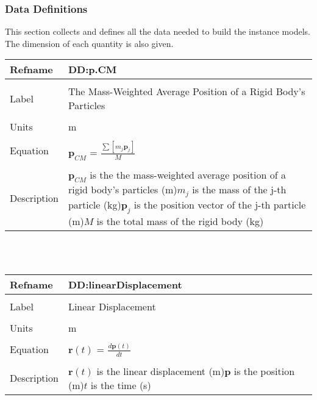 \documentclass[12pt]{article}
\begin{document}
\subsubsection{Data Definitions}
\label{Sec:DataDefi}
This section collects and defines all the data needed to build the instance models. The dimension of each quantity is also given.
~\newline
\noindent \begin{minipage}{\textwidth}
\begin{tabular}{p{} p{}}
\toprule \textbf{Refname} & \textbf{DD:p.CM}
\label{DD:p.CM}
\\ \midrule \\
Label & The Mass-Weighted Average Position of a Rigid Body's Particles
\\ \midrule \\
Units & m
\\ \midrule \\
Equation & ${\mathbf{p}_{CM}}$ = $\frac{\displaystyle\sum{\left[{m_{j}} {\mathbf{p}_{j}}\right]}}{M}$
\\ \midrule \\
Description & ${\mathbf{p}_{CM}}$ is the the mass-weighted average position of a rigid body's particles (m)\newline${m_{j}}$ is the mass of the j-th particle (kg)\newline${\mathbf{p}_{j}}$ is the position vector of the j-th particle (m)\newline$M$ is the total mass of the rigid body (kg)
\\ \bottomrule \end{tabular}
\end{minipage}\\
~\newline
\noindent \begin{minipage}{\textwidth}
\begin{tabular}{p{} p{}}
\toprule \textbf{Refname} & \textbf{DD:linearDisplacement}
\label{DD:linearDisplacement}
\\ \midrule \\
Label & Linear Displacement
\\ \midrule \\
Units & m
\\ \midrule \\
Equation & $\mathbf{r}(t)$ = $\frac{d \mathbf{p}\left(t\right)}{d t}$
\\ \midrule \\
Description & $\mathbf{r}(t)$ is the linear displacement (m)\newline$\mathbf{p}$ is the position (m)\newline$t$ is the time (s)
\\ \bottomrule \end{tabular}
\end{minipage}\\
\end{document}
